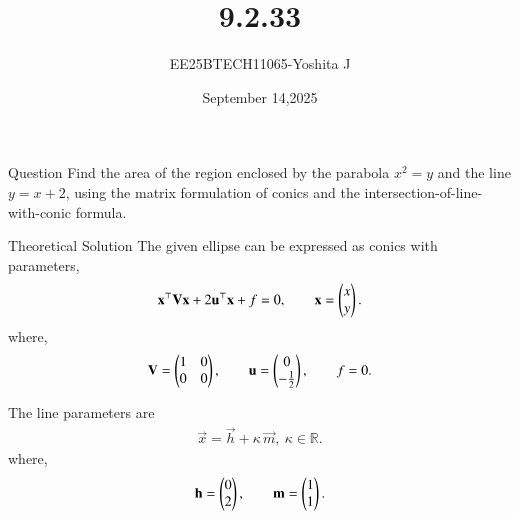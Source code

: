 \documentclass{beamer}
\begin{document}
\title 
{9.2.33}
\date{September 14,2025}


\author 
{EE25BTECH11065-Yoshita J}






\frame{\titlepage}
\begin{frame}{Question}
Find the area of the region enclosed by the parabola \(x^{2}=y\) and the line \(y=x+2\), using the matrix formulation of conics and the intersection-of-line-with-conic formula.\\

\end{frame}


\begin{frame}{Theoretical Solution}
The given ellipse can be expressed as conics with parameters,
\begin{align*}
\mathbf{x}^{\top}\mathbf{V}\mathbf{x}+2\mathbf{u}^{\top}\mathbf{x}+f=0,\qquad 
\mathbf{x}=\begin{pmatrix}x\\y\end{pmatrix}.
\end{align*}
where,
\begin{align}
\mathbf{V}=\begin{pmatrix}1 & 0\\0 & 0\end{pmatrix},\qquad
\mathbf{u}=\begin{pmatrix}0\\-\tfrac{1}{2}\end{pmatrix},\qquad
f=0.
\end{align}

The line parameters are 
\begin{align*}
\vec{x}=\vec{h}+\kappa\,\vec{m},\ \kappa\in\mathbb R.
\end{align*}
where,
\begin{align}
\mathbf{h}=\begin{pmatrix}0\\2\end{pmatrix},\qquad \mathbf{m}=\begin{pmatrix}1\\1\end{pmatrix}.
\end{align}

\end{frame}
\end{document}
